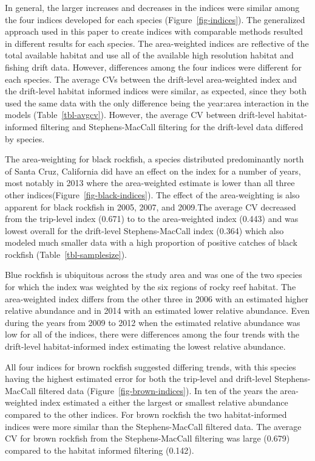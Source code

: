 \documentclass[
  12pt,
  authoryear,
  preprint,
  3p]{elsarticle}
\begin{document}
In general, the larger increases and decreases in the indices were
similar among the four indices developed for each species
(Figure~\ref{fig-indices}). The generalized approach used in this paper
to create indices with comparable methods resulted in different results
for each species. The area-weighted indices are reflective of the total
available habitat and use all of the available high resolution habitat
and fishing drift data. However, differences among the four indices were
different for each species. The average CVs between the drift-level
area-weighted index and the drift-level habitat informed indices were
similar, as expected, since they both used the same data with the only
difference being the year:area interaction in the models
(Table~\ref{tbl-avgcv}). However, the average CV between drift-level
habitat-informed filtering and Stephens-MacCall filtering for the
drift-level data differed by species.

The area-weighting for black rockfish, a species distributed
predominantly north of Santa Cruz, California did have an effect on the
index for a number of years, most notably in 2013 where the
area-weighted estimate is lower than all three other
indices(Figure~\ref{fig-black-indices}). The effect of the
area-weighting is also apparent for black rockfish in 2005, 2007, and
2009.The average CV decreased from the trip-level index (0.671) to to
the area-weighted index (0.443) and was lowest overall for the
drift-level Stephens-MacCall index (0.364) which also modeled much
smaller data with a high proportion of positive catches of black
rockfish (Table~\ref{tbl-samplesize}).

Blue rockfish is ubiquitous across the study area and was one of the two
species for which the index was weighted by the six regions of rocky
reef habitat. The area-weighted index differs from the other three in
2006 with an estimated higher relative abundance and in 2014 with an
estimated lower relative abundance. Even during the years from 2009 to
2012 when the estimated relative abundance was low for all of the
indices, there were differences among the four trends with the
drift-level habitat-informed index estimating the lowest relative
abundance.

All four indices for brown rockfish suggested differing trends, with
this species having the highest estimated error for both the trip-level
and drift-level Stephens-MacCall filtered data
(Figure~\ref{fig-brown-indices}). In ten of the years the area-weighted
index estimated a either the largest or smallest relative abundance
compared to the other indices. For brown rockfish the two
habitat-informed indices were more similar than the Stephens-MacCall
filtered data. The average CV for brown rockfish from the
Stephens-MacCall filtering was large (0.679) compared to the habitat
informed filtering (0.142).
\end{document}
